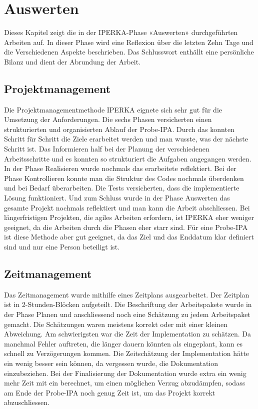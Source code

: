 \chapter{Auswerten}\label{ch:auswerten}
Dieses Kapitel zeigt die in der IPERKA-Phase «Auswerten» durchgeführten Arbeiten auf. In dieser Phase wird eine Reflexion über die letzten Zehn Tage und die Verschiedenen Aspekte beschrieben. Das Schlusswort enthällt eine persönliche Bilanz und dient der Abrundung der Arbeit.

\section{Projektmanagement}
Die Projektmanagementmethode IPERKA eignete sich sehr gut für die Umsetzung der Anforderungen. Die sechs Phasen versicherten einen strukturierten und organisierten Ablauf der Probe-IPA. Durch das konnten Schritt für Schritt die Ziele erarbeitet werden und man wusste, was der nächste Schritt ist. Das Informieren half bei der Planung der verschiedenen Arbeitsschritte und es konnten so strukturiert die Aufgaben angegangen werden. In der Phase Realisieren wurde nochmals das erarbeitete reflektiert. Bei der Phase Kontrollieren konnte man die Struktur des Codes nochmals überdenken und bei Bedarf überarbeiten. Die Tests versicherten, dass die implementierte Lösung funktioniert. Und zum Schluss wurde in der Phase Auswerten das gesamte Projekt nochmals reflektiert und man kann die Arbeit abschliessen. Bei längerfristigen Projekten, die agiles Arbeiten erfordern, ist IPERKA eher weniger geeignet, da die Arbeiten durch die Phasen eher starr sind. Für eine Probe-IPA ist diese Methode aber gut geeignet, da das Ziel und das Enddatum klar definiert sind und nur eine Person beteiligt ist.

\section{Zeitmanagement}
Das Zeitmanagement wurde mithilfe eines Zeitplans ausgearbeitet. Der Zeitplan ist in 2-Stunden-Blöcken aufgeteilt. Die Beschriftung der Arbeitspakete wurde in der Phase Planen und anschliessend noch eine Schätzung zu jedem Arbeitspaket gemacht. Die Schätzungen waren meistens korrekt oder mit einer kleinen Abweichung. Am schwierigsten war die Zeit der Implementation zu schätzen. Da manchmal Fehler auftreten, die länger dauern könnten als eingeplant, kann es schnell zu Verzögerungen kommen. Die Zeitschätzung der Implementation hätte ein wenig besser sein können, da vergessen wurde, die Dokumentation einzubeziehen. Bei der Finalisierung der Dokumentation wurde extra ein wenig mehr Zeit mit ein berechnet, um einen möglichen Verzug abzudämpfen, sodass am Ende der Probe-IPA noch genug Zeit ist, um das Projekt korrekt abzuschliessen.

